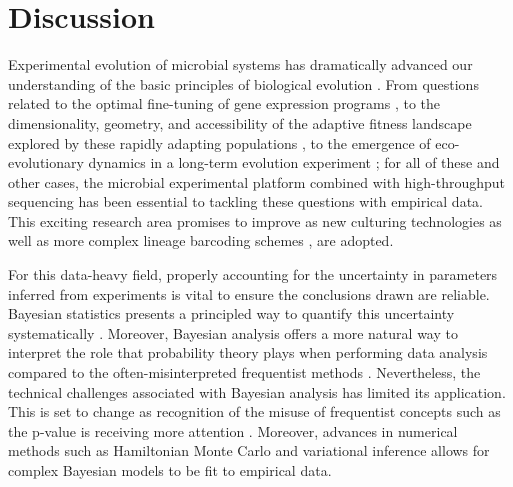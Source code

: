 \documentclass[
]{scrartcl}
\begin{document}
\begin{refsegment}
\begin{figure}
\end{figure}

\hypertarget{discussion}{%
\section{Discussion}\label{discussion}}

Experimental evolution of microbial systems has dramatically advanced
our understanding of the basic principles of biological evolution
\autocite{kussell2013}. From questions related to the optimal
fine-tuning of gene expression programs \autocite{Dekel2005}, to the
dimensionality, geometry, and accessibility of the adaptive fitness
landscape explored by these rapidly adapting populations
\autocite{kinsler2020,maeda2020}, to the emergence of eco-evolutionary
dynamics in a long-term evolution experiment \autocite{good2017}; for
all of these and other cases, the microbial experimental platform
combined with high-throughput sequencing has been essential to tackling
these questions with empirical data. This exciting research area
promises to improve as new culturing technologies \autocite{jagdish2022}
as well as more complex lineage barcoding schemes
\autocite{nguyenba2019a,yang2022}, are adopted.

For this data-heavy field, properly accounting for the uncertainty in
parameters inferred from experiments is vital to ensure the conclusions
drawn are reliable. Bayesian statistics presents a principled way to
quantify this uncertainty systematically \autocite{gelman2010}.
Moreover, Bayesian analysis offers a more natural way to interpret the
role that probability theory plays when performing data analysis
compared to the often-misinterpreted frequentist methods
\autocite{vanderplas2014}. Nevertheless, the technical challenges
associated with Bayesian analysis has limited its application. This is
set to change as recognition of the misuse of frequentist concepts such
as the p-value is receiving more attention \autocite{nuzzo2014}.
Moreover, advances in numerical methods such as Hamiltonian Monte Carlo
\autocite{betancourt2017} and variational inference
\autocite{kucukelbir2016} allows for complex Bayesian models to be fit
to empirical data.


\end{refsegment}
\end{document}

